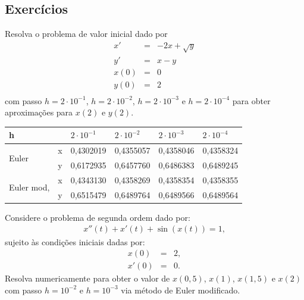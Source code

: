 \subsection*{Exercícios}

\begin{exer}Resolva o problema de valor inicial dado por
\begin{eqnarray}
x'&=& -2x + \sqrt{y}\\
y'&=& x - y\\
x(0)&=&0\\
y(0)&=&2\\
\end{eqnarray}
com passo $h=2\cdot 10^{-1}$, $h=2\cdot 10^{-2}$, $h=2\cdot 10^{-3}$ e $h=2\cdot 10^{-4}$ para obter aproximações para $x(2)$ e $y(2)$.
\end{exer}
\begin{resp}

 \begin{center}
 \begin{tabular}{|l|l|l|l|l|l|}%
\hline
   h                   & &$2\cdot 10^{-1}$&$2\cdot 10^{-2}$&$2\cdot 10^{-3}$&$2\cdot 10^{-4}$\\
   \hline
 \multirow{2}{*}{Euler}&x&0,4302019&0,4355057&0,4358046&0,4358324\\
                       &y& 0,6172935&0,6457760&0,6486383&0,6489245\\
  \hline

 \multirow{2}{*}{Euler mod,}&x&  0,4343130&0,4358269&0,4358354&0,4358355\\
                       &y& 0,6515479&0,6489764&0,6489566&0,6489564 \\

   \hline


 \end{tabular}
\end{center}
\end{resp}

\begin{exer} Considere o problema de segunda ordem dado por:
\begin{eqnarray}
 x''(t)+x'(t)+\sin(x(t))=1,
\end{eqnarray}
sujeito às condições iniciais dadas por:
\begin{eqnarray}
x(0)&=&2,\\
x'(0)&=&0.
\end{eqnarray}
Resolva numericamente para obter o valor de $x(0,5)$, $x(1)$, $x(1,5)$ e $x(2)$ com passo $h=10^{-2}$ e $h=10^{-3}$ via método de Euler modificado.
\end{exer}

